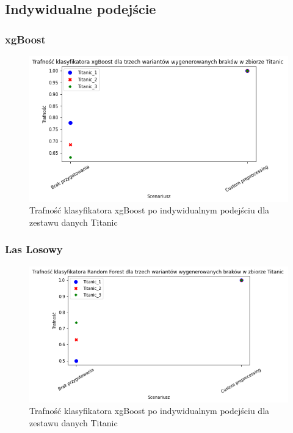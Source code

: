 \documentclass{book}
\begin{document}
\subsection{Indywidualne podejście}

\subsubsection{xgBoost} 
\begin{figure}[H]
    \centerline{\includegraphics[scale=0.5]{Titanic_xgb_Custom}}
    \centering
    \caption{Trafność klasyfikatora xgBoost po indywidualnym podejściu dla zestawu danych Titanic}
    \end{figure}

\subsubsection{Las Losowy}

\begin{figure}[H]
    \centerline{\includegraphics[scale=0.5]{Titanic_rfc_Custom}}
    \centering
    \caption{Trafność klasyfikatora xgBoost po indywidualnym podejściu dla zestawu danych Titanic}
    \end{figure}
    
\end{document}
